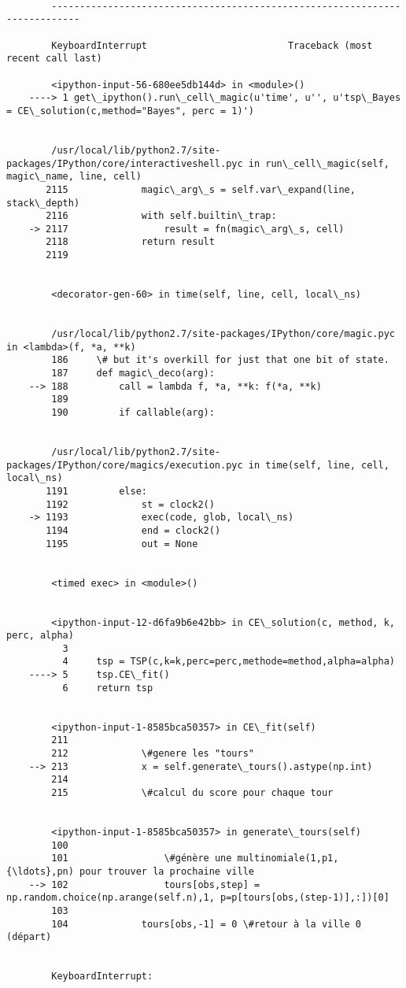\documentclass[11pt]{article}
\begin{document}
    \begin{Verbatim}[commandchars=\\\{\}]

        ---------------------------------------------------------------------------

        KeyboardInterrupt                         Traceback (most recent call last)

        <ipython-input-56-680ee5db144d> in <module>()
    ----> 1 get\_ipython().run\_cell\_magic(u'time', u'', u'tsp\_Bayes = CE\_solution(c,method="Bayes", perc = 1)')
    

        /usr/local/lib/python2.7/site-packages/IPython/core/interactiveshell.pyc in run\_cell\_magic(self, magic\_name, line, cell)
       2115             magic\_arg\_s = self.var\_expand(line, stack\_depth)
       2116             with self.builtin\_trap:
    -> 2117                 result = fn(magic\_arg\_s, cell)
       2118             return result
       2119 


        <decorator-gen-60> in time(self, line, cell, local\_ns)


        /usr/local/lib/python2.7/site-packages/IPython/core/magic.pyc in <lambda>(f, *a, **k)
        186     \# but it's overkill for just that one bit of state.
        187     def magic\_deco(arg):
    --> 188         call = lambda f, *a, **k: f(*a, **k)
        189 
        190         if callable(arg):


        /usr/local/lib/python2.7/site-packages/IPython/core/magics/execution.pyc in time(self, line, cell, local\_ns)
       1191         else:
       1192             st = clock2()
    -> 1193             exec(code, glob, local\_ns)
       1194             end = clock2()
       1195             out = None


        <timed exec> in <module>()


        <ipython-input-12-d6fa9b6e42bb> in CE\_solution(c, method, k, perc, alpha)
          3 
          4     tsp = TSP(c,k=k,perc=perc,methode=method,alpha=alpha)
    ----> 5     tsp.CE\_fit()
          6     return tsp


        <ipython-input-1-8585bca50357> in CE\_fit(self)
        211 
        212             \#genere les "tours"
    --> 213             x = self.generate\_tours().astype(np.int)
        214 
        215             \#calcul du score pour chaque tour


        <ipython-input-1-8585bca50357> in generate\_tours(self)
        100 
        101                 \#génère une multinomiale(1,p1,{\ldots},pn) pour trouver la prochaine ville
    --> 102                 tours[obs,step] = np.random.choice(np.arange(self.n),1, p=p[tours[obs,(step-1)],:])[0]
        103 
        104             tours[obs,-1] = 0 \#retour à la ville 0 (départ)


        KeyboardInterrupt: 

    \end{Verbatim}
\end{document}
